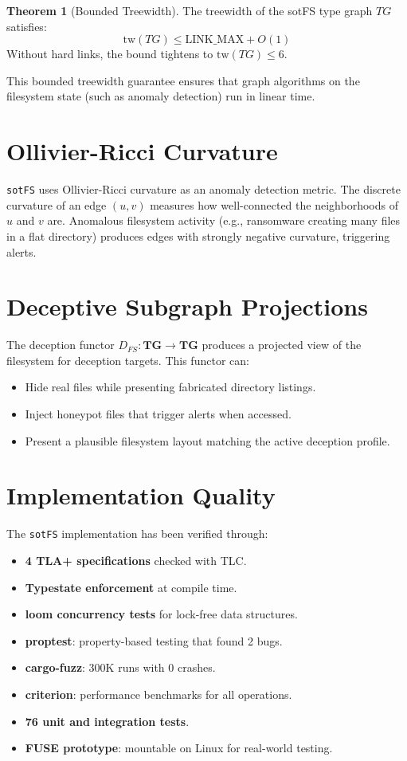 \documentclass[11pt,a4paper,twoside]{report}
\theoremstyle{definition}
\newtheorem{theorem}{Theorem}[chapter]
\newcommand{\sotFS}{\texttt{sotFS}}
\begin{document}
\begin{theorem}[Bounded Treewidth]
The treewidth of the sotFS type graph $TG$ satisfies:
\[
  \mathrm{tw}(TG) \leq \mathrm{LINK\_MAX} + O(1)
\]
Without hard links, the bound tightens to $\mathrm{tw}(TG) \leq 6$.
\end{theorem}

This bounded treewidth guarantee ensures that graph algorithms on the
filesystem state (such as anomaly detection) run in linear time.

\section{Ollivier-Ricci Curvature}

\sotFS{} uses Ollivier-Ricci curvature as an anomaly detection metric. The
discrete curvature of an edge $(u, v)$ measures how well-connected the
neighborhoods of $u$ and $v$ are. Anomalous filesystem activity (e.g.,
ransomware creating many files in a flat directory) produces edges with
strongly negative curvature, triggering alerts.

\section{Deceptive Subgraph Projections}

The deception functor $D_{FS} : \mathbf{TG} \to \mathbf{TG}$ produces a
projected view of the filesystem for deception targets. This functor can:
\begin{itemize}[leftmargin=1.4em]
  \item Hide real files while presenting fabricated directory listings.
  \item Inject honeypot files that trigger alerts when accessed.
  \item Present a plausible filesystem layout matching the active deception
    profile.
\end{itemize}

\section{Implementation Quality}

The \sotFS{} implementation has been verified through:
\begin{itemize}[leftmargin=1.4em]
  \item \textbf{4 TLA+ specifications} checked with TLC.
  \item \textbf{Typestate enforcement} at compile time.
  \item \textbf{loom concurrency tests} for lock-free data structures.
  \item \textbf{proptest}: property-based testing that found 2 bugs.
  \item \textbf{cargo-fuzz}: 300K runs with 0 crashes.
  \item \textbf{criterion}: performance benchmarks for all operations.
  \item \textbf{76 unit and integration tests}.
  \item \textbf{FUSE prototype}: mountable on Linux for real-world testing.
\end{itemize}
\end{document}
